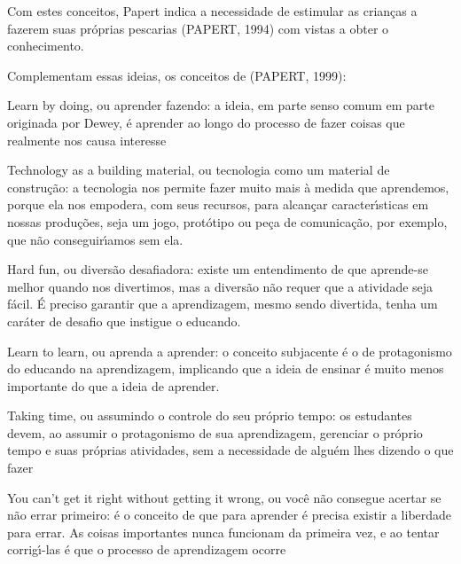 \documentclass[
12pt,		%
openright,	%
twoside,  %
a4paper,			%
chapter=TITLE,		%
english,			%
french,				%
spanish,			%
brazil				%
]{USPSC-classe/USPSC}
\begin{document}
Com estes conceitos, Papert indica a necessidade de estimular as crian\c{c}as a fazerem suas pr\'oprias pescarias  (PAPERT, 1994) com vistas a obter o conhecimento.









Complementam essas ideias, os conceitos de  (PAPERT, 1999):










\begin{alineas}
\item Learn by doing, ou aprender fazendo: a ideia, em parte senso comum em parte originada por Dewey, \'e aprender ao longo do processo de fazer coisas que realmente nos causa interesse
\item Technology as a building material, ou \textquotedbl tecnologia como um material de constru\c{c}\~ao\textquotedbl : a tecnologia nos permite fazer muito mais \`a medida que aprendemos, porque ela nos empodera, com seus recursos, para alcan\c{c}ar caracter\'{\i}sticas em nossas produ\c{c}\~oes, seja um jogo, prot\'otipo ou pe\c{c}a de comunica\c{c}\~ao, por exemplo, que n\~ao conseguir\'{\i}amos sem ela.
\item Hard fun, ou \textquotedbl divers\~ao desafiadora\textquotedbl : existe um entendimento de que aprende-se melhor quando nos divertimos, mas a divers\~ao n\~ao requer que a atividade seja f\'acil. \'E preciso garantir que a aprendizagem, mesmo sendo divertida, tenha um car\'ater de desafio que instigue o educando.
\item Learn to learn, ou \textquotedbl aprenda a aprender\textquotedbl : o conceito subjacente \'e o de protagonismo do educando na aprendizagem, implicando que a ideia de ensinar \'e muito menos importante do que a ideia de aprender.
\item Taking time, ou \textquotedbl assumindo o controle do seu pr\'oprio tempo\textquotedbl : os estudantes devem, ao assumir o protagonismo de sua aprendizagem, gerenciar o pr\'oprio tempo e suas pr\'oprias atividades, sem a necessidade de algu\'em lhes dizendo o que fazer
\item You can't get it right without getting it wrong, ou \textquotedbl voc\^e n\~ao consegue acertar se n\~ao errar primeiro\textquotedbl : \'e o conceito de que para aprender \'e precisa existir a liberdade para errar. As coisas importantes nunca funcionam da primeira vez, e ao tentar corrig\'{\i}-las \'e que o processo de aprendizagem ocorre

\end{alineas}
\end{document}
